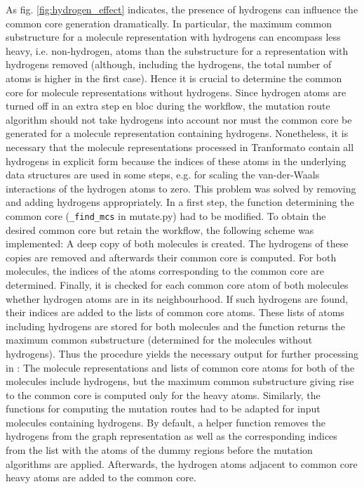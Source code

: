 As fig. \ref{fig:hydrogen_effect} indicates, the presence of hydrogens can influence the common core generation dramatically. In particular, the maximum common substructure for a molecule representation with hydrogens can encompass less heavy, i.e. non-hydrogen, atoms than the substructure for a representation with hydrogens removed (although, including the hydrogens, the total number of atoms is higher in the first case). Hence it is crucial to determine the common core for molecule representations without hydrogens. Since hydrogen atoms are turned off in an extra step en bloc during the {\trafo} workflow, the mutation route algorithm should not take hydrogens into account nor must the common core be generated for a molecule representation containing hydrogens.
Nonetheless, it is necessary that the molecule representations processed in Tranformato contain all hydrogens in explicit form because the indices of these atoms in the underlying data structures are used in some steps, e.g. for scaling the van-der-Waals interactions of the hydrogen atoms to zero.
This problem was solved by removing and adding hydrogens appropriately.
In a first step, the {\trafo} function determining the common core (\texttt{\_find\_mcs} in mutate.py) had to be modified. To obtain the desired common core but retain the {\trafo} workflow, the following scheme was implemented:
A deep copy of both molecules is created. The hydrogens of these copies are removed and afterwards their common core is computed. For both molecules, the indices of the atoms corresponding to the common core are determined. Finally, it is checked for each common core atom of both molecules whether hydrogen atoms are in its neighbourhood. If such hydrogens are found, their indices are added to the lists of common core atoms. These lists of atoms including hydrogens are stored for both molecules and the function returns the maximum common substructure (determined for the molecules without hydrogens).
Thus the procedure yields the necessary output for further processing in {\trafo}: The molecule representations and lists of common core atoms for both of the molecules include hydrogens, but the maximum common substructure giving rise to the common core is computed only for the heavy atoms.
Similarly, the functions for computing the mutation routes had to be adapted for input molecules containing hydrogens. By default, a helper function removes the hydrogens from the graph representation as well as the corresponding indices from the list with the atoms of the dummy regions before the mutation algorithms are applied. Afterwards, the hydrogen atoms adjacent to common core heavy atoms are added to the common core.
